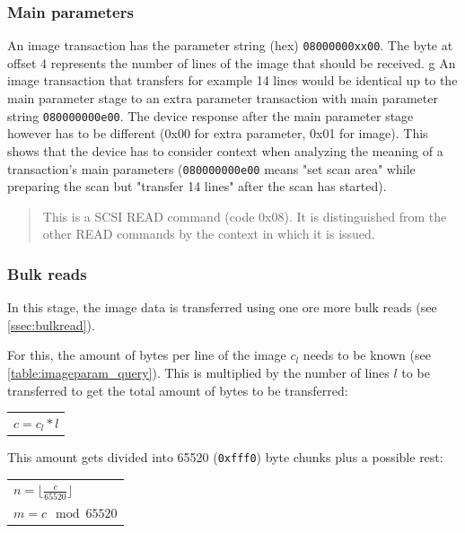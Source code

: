 \documentclass{article}
\begin{document}
\subsubsection{Main parameters}
\label{ssec:image_param}

An image transaction has the parameter string (hex) {\tt 08000000xx00}.
The byte at offset 4 represents the number of lines of the image that
should be received.
g
An image transaction that transfers for example 14 lines would be identical
up to the main parameter stage
to an extra parameter transaction with main parameter string {\tt 080000000e00}.
The device response after the main parameter stage however has to be different
(0x00 for extra parameter, 0x01 for image). This shows that the device has
to consider context when analyzing the meaning of a transaction's main parameters
({\tt 080000000e00} means "set scan area" while preparing the scan but
"transfer 14 lines" after the scan has started).

\blockquote[{\cite[\tt pieusb\_scancmd.c, sanei\_pieusb\_cmd\_start\_scan()]{sane_code}}]
{This is a SCSI READ command (code 0x08).
 It is distinguished from the other READ commands by the context
 in which it is issued. \\}

\subsubsection{Bulk reads}
\label{ssec:image_bulk}

In this stage, the image data is transferred using one ore more
bulk reads (see \autoref{ssec:bulkread}).

For this, the amount of bytes per line of the image $c_l$ needs to be known
(see \autoref{table:imageparam_query}). This is multiplied by the number of lines $l$ to be transferred
to get the total amount of bytes to be transferred:

\begin{center}
\begin{tabular}{l}
$ c = c_l * l $
\end{tabular}
\end{center}

This amount gets divided into 65520 ({\tt 0xfff0}) byte chunks plus a possible rest:

\begin{center}
\begin{tabular}{l}
$n = \lfloor \frac{c}{65520} \rfloor $ \\
$m = c \mod 65520$ \\
\end{tabular}
\end{center}
\end{document}
